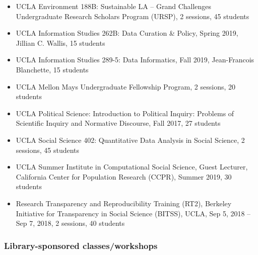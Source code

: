 \begin{itemize}[label={}, leftmargin=!,labelindent=5pt,itemindent=-15pt]
  \item UCLA Environment 188B: Sustainable LA – Grand Challenges Undergraduate Research Scholars Program (URSP), 2 sessions, 45 students
  \item UCLA Information Studies 262B: Data Curation \& Policy, Spring 2019, Jillian C. Wallis, 15 students
  \item UCLA Information Studies 289-5: Data Informatics, Fall 2019, Jean-Francois Blanchette, 15 students
  \item UCLA Mellon Mays Undergraduate Fellowship Program, 2 sessions, 20 students
  \item UCLA Political Science: Introduction to Political Inquiry: Problems of Scientific Inquiry and Normative Discourse, Fall 2017, 27 students
  \item UCLA Social Science 402: Quantitative Data Analysis in Social Science, 2 sessions, 45 students
  \item UCLA Summer Institute in Computational Social Science, Guest Lecturer, California Center for Population Research (CCPR), Summer 2019, 30 students
  \item Research Transparency and Reproducibility Training (RT2), Berkeley Initiative for Transparency in Social Science (BITSS), UCLA, Sep 5, 2018 -- Sep 7, 2018, 2 sessions, 40 students
\end{itemize}

\subsubsection{Library-sponsored classes/workshops}

